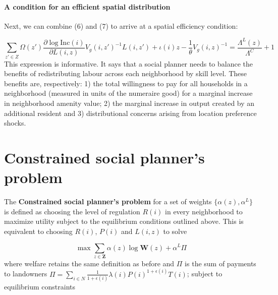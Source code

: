 \documentclass[11pt]{article}
\begin{document}
	\paragraph*{A condition for an efficient spatial distribution} Next, we can combine (6) and (7) to arrive at a spatial efficiency condition:
	
	\begin{equation*}
	\sum_{z' \in Z}\Omega(z')\frac{\partial \log \text{Inc}(i)}{\partial L(i, z)}V_{g}(i, z')^{-1}L(i, z') + \iota(i)z- \frac{1}{\theta}V_{g}(i, z)^{-1}= \frac{\Lambda^{L}(z) }{\Lambda^{C}} + 1
	\end{equation*}
	This expression is informative. It says that a social planner needs to balance the benefits of redistributing labour across each neighborhood by skill level. These benefits are, respectively: 1) the total willingness to pay for all households in a neighborhood (measured in units of the numeraire good) for a marginal increase in neighborhood amenity value; 2) the marginal increase in output created by an additional resident and 3) distributional concerns arising from location preference shocks. 
	
	
	\section*{Constrained social planner's problem}
	
	The \textbf{Constrained social planner's problem} for a set of weights $\{\alpha(z), \alpha^{L}\}$ is defined as choosing the level of regulation $R(i)$ in every neighborhood to maximize utility subject to the equilibrium conditions outlined above. This is equivalent to choosing $R(i)$, $P(i)$ and $L(i, z)$ to solve 
	
	\begin{equation}
		\max  \sum_{z \in \boldsymbol{Z}}\alpha(z)\log \boldsymbol{W}(z) +\alpha^{L}\Pi
	\end{equation}
	where welfare retains the same definition as before and $\Pi$ is the sum of payments to landowners $\Pi = \sum_{i \in N}\frac{1}{1 + \epsilon(i)}\lambda(i)P(i)^{1 + \epsilon(i)}T(i)$; subject to equilibrium constraints
	
\end{document}
